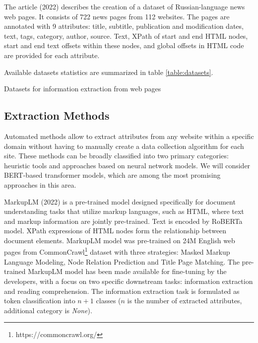 The article \cite{newsdataset} (2022) describes the creation of a dataset of Russian-language news web pages. It consists of 722 news pages from 112 websites. The pages are annotated with 9 attributes: title, subtitle, publication and modification dates, text, tags, category, author, source. Text, XPath of start and end HTML nodes, start and end text offsets within these nodes, and global offsets in HTML code are provided for each attribute.

Available datasets statistics are summarized in table \ref{table:datasets}.

\begin{table}[ht!]
    \caption{Datasets for information extraction from web pages}
    \begin{center}
    
    \end{center}
    \label{table:datasets}
\end{table}

\subsection{Extraction Methods}
Automated methods allow to extract attributes from any website within a specific domain without having to manually create a data collection algorithm for each site. These methods can be broadly classified into two primary categories: heuristic tools and approaches based on neural network models. We will consider BERT-based transformer models, which are among the most promising approaches in this area.

MarkupLM \cite{markuplm} (2022) is a pre-trained model designed specifically for document understanding tasks that utilize markup languages, such as HTML, where text and markup information are jointly pre-trained. Text is encoded by RoBERTa \cite{roberta} model. XPath expressions of HTML nodes form the relationship between document elements. MarkupLM model was pre-trained on 24M English web pages from CommonCrawl\footnote{https://commoncrawl.org/} dataset with three strategies: Masked Markup Language Modeling, Node Relation Prediction and Title Page Matching. The pre-trained MarkupLM model has been made available for fine-tuning by the developers, with a focus on two specific downstream tasks: information extraction and reading comprehension. The information extraction task is formulated as token classification into $n+1$ classes ($n$ is the number of extracted attributes, additional category is \textit{None}). 

